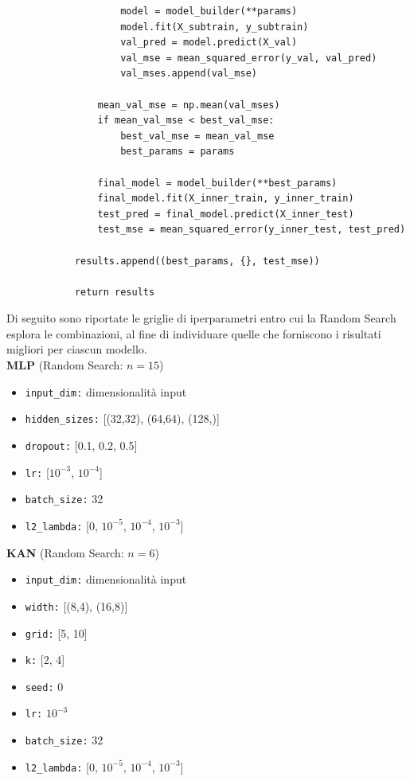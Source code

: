 \documentclass[a4paper,12pt]{report}
\begin{document}
\begin{verbatim}
					model = model_builder(**params)
					model.fit(X_subtrain, y_subtrain)
					val_pred = model.predict(X_val)
					val_mse = mean_squared_error(y_val, val_pred)
					val_mses.append(val_mse)
				
				mean_val_mse = np.mean(val_mses)
				if mean_val_mse < best_val_mse:
					best_val_mse = mean_val_mse
					best_params = params
			
				final_model = model_builder(**best_params)
				final_model.fit(X_inner_train, y_inner_train)
				test_pred = final_model.predict(X_inner_test)
				test_mse = mean_squared_error(y_inner_test, test_pred)
			
			results.append((best_params, {}, test_mse))
			
			return results
	\end{verbatim}
	
	Di seguito sono riportate le griglie di iperparametri entro cui la Random Search esplora le combinazioni, al fine di individuare quelle che forniscono i risultati migliori per ciascun modello. \\
	\smallskip
	\noindent\textbf{MLP} \quad (Random Search: $n=15$)
	\begin{itemize}
		\item \texttt{input\_dim:} dimensionalità input
		\item \texttt{hidden\_sizes:} [(32,32), (64,64), (128,)]
		\item \texttt{dropout:} [0.1, 0.2, 0.5]
		\item \texttt{lr:} [$10^{-3}$, $10^{-4}$]
		\item \texttt{batch\_size:} 32
		\item \texttt{l2\_lambda:} [0, $10^{-5}$, $10^{-4}$, $10^{-3}$]
	\end{itemize}
	
	\smallskip
	\noindent\textbf{KAN} \quad (Random Search: $n=6$)
	\begin{itemize}
		\item \texttt{input\_dim:} dimensionalità input
		\item \texttt{width:} [(8,4), (16,8)]
		\item \texttt{grid:} [5, 10]
		\item \texttt{k:} [2, 4]
		\item \texttt{seed:} 0
		\item \texttt{lr:} $10^{-3}$
		\item \texttt{batch\_size:} 32
		\item \texttt{l2\_lambda:} [0, $10^{-5}$, $10^{-4}$, $10^{-3}$]
	\end{itemize}
	
\end{document}
